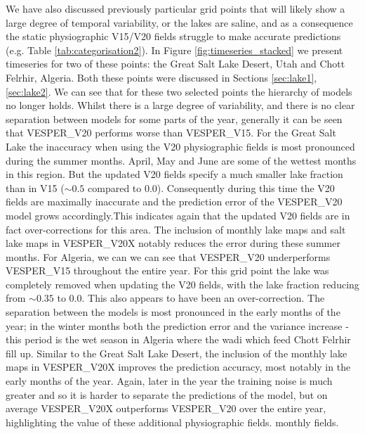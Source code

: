 \documentclass[hess, twostagejnl]{copernicus}
\begin{document}
We have also discussed previously particular grid points that will likely show a large degree of temporal variability, or the lakes are saline, and as a consequence the static physiographic V15/V20 fields struggle to make accurate predictions (e.g. Table \ref{tab:categorisation2}). In Figure \ref{fig:timeseries_stacked} we present timeseries for two of these points: the Great Salt Lake Desert, Utah and  Chott Felrhir, Algeria. Both these points were discussed in Sections \ref{sec:lake1}, \ref{sec:lake2}. We can see that for these two selected points the hierarchy of models no longer holds. Whilst there is a large degree of variability, and there is no clear separation between models for some parts of the year, generally it can be seen that VESPER\_V20 performs worse than VESPER\_V15. For the Great Salt Lake the inaccuracy when using the V20 physiographic fields is most pronounced during the summer months. April, May and June are some of the wettest months in this region. But the updated V20 fields specify a much smaller lake fraction than in V15 ($\sim 0.5$ compared to $0.0$). Consequently during this time the V20 fields are maximally inaccurate and the prediction error of the VESPER\_V20 model grows accordingly.This indicates again that the updated V20 fields are in fact over-corrections for this area. The inclusion of monthly lake maps and salt lake maps in VESPER\_V20X notably reduces the error during these summer months. For Algeria, we can we can see that VESPER\_V20 underperforms VESPER\_V15 throughout the entire year. For this grid point the lake was completely removed when updating the V20 fields, with the lake fraction reducing from $\sim 0.35$ to 0.0. This also appears to have been an over-correction. The separation between the models is most pronounced in the early months of the year; in the winter months both the prediction error and the variance increase - this period is the wet season in Algeria where the wadi which feed Chott Felrhir fill up. Similar to the Great Salt Lake Desert, the inclusion of the monthly lake maps in VESPER\_V20X improves the prediction accuracy, most notably in the early months of the year. Again, later in the year the training noise is much greater and so it is harder to separate the predictions of the model, but on average VESPER\_V20X outperforms VESPER\_V20 over the entire year, highlighting the value of these additional physiographic fields. monthly fields. 
\end{document}
